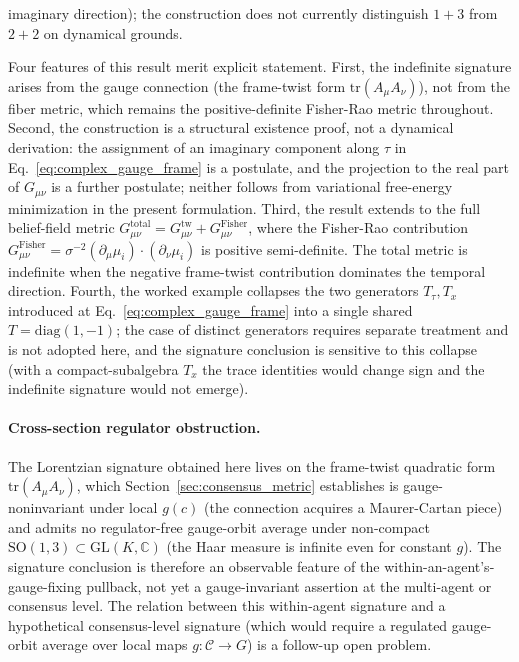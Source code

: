 \documentclass[11pt]{article}
\begin{document}
imaginary direction); the construction does not currently distinguish $1{+}3$ from $2{+}2$ on dynamical grounds.

Four features of this result merit explicit statement. First, the indefinite signature arises from the gauge connection (the frame-twist form $\mathrm{tr}(A_\mu A_\nu)$), not from the fiber metric, which remains the positive-definite Fisher-Rao metric throughout. Second, the construction is a structural existence proof, not a dynamical derivation: the assignment of an imaginary component along $\tau$ in Eq.~\eqref{eq:complex_gauge_frame} is a postulate, and the projection to the real part of $G_{\mu\nu}$ is a further postulate; neither follows from variational free-energy minimization in the present formulation. Third, the result extends to the full belief-field metric $G_{\mu\nu}^{\mathrm{total}} = G_{\mu\nu}^{\mathrm{tw}} + G_{\mu\nu}^{\mathrm{Fisher}}$, where the Fisher-Rao contribution $G_{\mu\nu}^{\mathrm{Fisher}} = \sigma^{-2}(\partial_\mu \mu_i) \cdot (\partial_\nu \mu_i)$ is positive semi-definite. The total metric is indefinite when the negative frame-twist contribution dominates the temporal direction. Fourth, the worked example collapses the two generators $T_\tau, T_x$ introduced at Eq.~\eqref{eq:complex_gauge_frame} into a single shared $T = \mathrm{diag}(1, -1)$; the case of distinct generators requires separate treatment and is not adopted here, and the signature conclusion is sensitive to this collapse (with a compact-subalgebra $T_x$ the trace identities would change sign and the indefinite signature would not emerge).

\paragraph{Cross-section regulator obstruction.}
The Lorentzian signature obtained here lives on the frame-twist quadratic form $\mathrm{tr}(A_\mu A_\nu)$, which Section~\ref{sec:consensus_metric} establishes is gauge-noninvariant under local $g(c)$ (the connection acquires a Maurer-Cartan piece) and admits no regulator-free gauge-orbit average under non-compact $\mathrm{SO}(1,3) \subset \mathrm{GL}(K, \mathbb{C})$ (the Haar measure is infinite even for constant $g$). The signature conclusion is therefore an observable feature of the within-an-agent's-gauge-fixing pullback, not yet a gauge-invariant assertion at the multi-agent or consensus level. The relation between this within-agent signature and a hypothetical consensus-level signature (which would require a regulated gauge-orbit average over local maps $g: \mathcal{C} \to G$) is a follow-up open problem.
\end{document}
